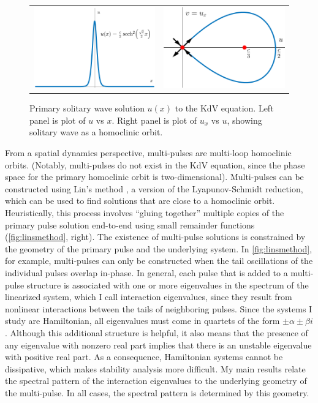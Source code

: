 \documentclass[11pt,reqno,oneside]{article}
\theoremstyle{definition}
\theoremstyle{remark}
\begin{document}
\begin{figure}
    \centering
    \begin{tabular}{cc}
        \includegraphics[width=6cm]{images/KdVsolitoneq.png} \hspace{2cm} &
        \includegraphics[width=6cm]{images/KdVphaseportait.png} 
    \end{tabular}
    \caption{Primary solitary wave solution $u(x)$ to the KdV equation. Left panel is plot of $u$ vs $x$. Right panel is plot of $u_x$ vs $u$, showing solitary wave as a homoclinic orbit.}
    \label{fig:kdvpp}
\end{figure}

From a spatial dynamics perspective, multi-pulses are multi-loop homoclinic orbits. (Notably, multi-pulses do not exist in the KdV equation, since the phase space for the primary homoclinic orbit is two-dimensional). Multi-pulses can be constructed using Lin's method \cite{Lin2008}, a version of the Lyapunov-Schmidt reduction, which can be used to find solutions that are close to a homoclinic orbit. Heuristically, this process involves ``gluing together'' multiple copies of the primary pulse solution end-to-end using small remainder functions (\cref{fig:linsmethod}, right). The existence of multi-pulse solutions is constrained by the geometry of the primary pulse and the underlying system. In \cref{fig:linsmethod}, for example, multi-pulses can only be constructed  when the tail oscillations of the individual pulses overlap in-phase. In general, each pulse that is added to a multi-pulse structure is associated with one or more eigenvalues in the spectrum of the linearized system, which I call interaction eigenvalues, since they result from nonlinear interactions between the tails of neighboring pulses. Since the systems I study are Hamiltonian, all eigenvalues must come in quartets of the form $\pm \alpha \pm \beta i$. Although this additional structure is helpful, it also means that the presence of any eigenvalue with nonzero real part implies that there is an unstable eigenvalue with positive real part. As a consequence, Hamiltonian systems cannot be dissipative, which makes stability analysis more difficult.
My main results relate the spectral pattern of the interaction eigenvalues to the underlying geometry of the multi-pulse. In all cases, the spectral pattern is determined by this geometry. 
\end{document}

